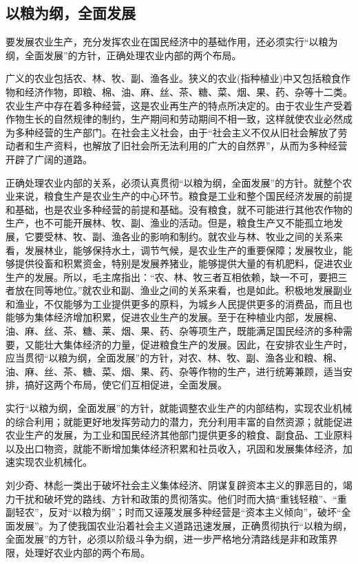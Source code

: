 \documentclass{book}
\begin{document}
\subsection{以粮为纲，全面发展}

要发展农业生产，充分发挥农业在国民经济中的基础作用，还必须实行“以粮为纲，全面发展”的方针，正确处理农业内部的两个布局。

广义的农业包括农、林、牧、副、渔各业。狭义的农业(指种植业)中又包括粮食作物和经济作物，即粮、棉、油、麻、丝、茶、糖、菜、烟、果、药、杂等十二类。农业生产中存在着多种经营，这是农业再生产的特点所决定的。由于农业生产受着作物生长的自然规律的制约，生产期间和劳动期间不相一致，这样就使农业必然成为多种经营的生产部门。在社会主义社会，由于“社会主义不仅从旧社会解放了劳动者和生产资料，也解放了旧社会所无法利用的广大的自然界”，从而为多种经营开辟了广阔的道路。

正确处理农业内部的关系，必须认真贯彻“以粮为纲，全面发展”的方针。就整个农业来说，粮食生产是农业生产的中心环节。粮食是工业和整个国民经济发展的前提和基础，也是农业多种经营的前提和基础。没有粮食，就不可能进行其他农作物的生产，也不可能开展林、牧、副、渔业的活动。但是，粮食生产又不能孤立地发展，它要受林、牧、副、渔各业的影响和制约。就农业与林、牧业之间的关系来看，发展林业，能够保持水土，调节气候，是农业生产的重要保障；发展牧业，能够提供役畜和积累资金，特别是发展养猪业，能够提供大量的有机肥料，促进农业生产的发展。所以，毛主席指出：“农、林、牧三者互相依赖，缺一不可，要把三者放在同等地位。”就农业和副、渔业之间的关系来看，也是如此。积极地发展副业和渔业，不仅能够为工业提供更多的原料，为城乡人民提供更多的消费品，而且也能够为集体经济增加积累，促进农业生产的发展。至于在种植业内部，发展棉、油、麻、丝、茶、糖、莱、烟、果、药、杂等项生产，既能满足国民经济的多种需要，又能壮大集体经济的力量，促进粮食生产的发展。因此，在安排农业生产时，应当贯彻“以粮为纲，全面发展”的方针，对农、林、牧、副、渔各业和粮、棉、油、麻、丝、茶、糖、菜、烟、果、药、杂等作物的生产，进行统筹兼顾，适当安排，搞好这两个布局，使它们互相促进，全面发展。

实行“以粮为纲，全面发展”的方针，就能调整农业生产的内部结构，实现农业机械的综合利用；就能更好地发挥劳动力的潜力，充分利用丰富的自然资源；就能促进农业生产的发展，为工业和国民经济其他部门提供更多的粮食、副食品、工业原料以及出口物资，就能不断增加集体经济积累和社员收入，巩固和发展集体经济，加速实现农业机械化。

刘少奇、林彪一类出于破坏社会主义集体经济、阴谋复辟资本主义的罪恶目的，竭力干扰和破坏党的路线、方针和政策的贯彻落实。他们时而大搞“重钱轻粮”、“重副轻农”，反对“以粮为纲”；时而又诬蔑发展多种经营是“资本主义倾向”，破坏“全面发展”。为了使我国农业沿着社会主义道路迅速发展，正确贯彻执行“以粮为纲，全面发展”的方针，必须以阶级斗争为纲，进一步严格地分清路线是非和政策界限，处理好农业内部的两个布局。
\end{document}
